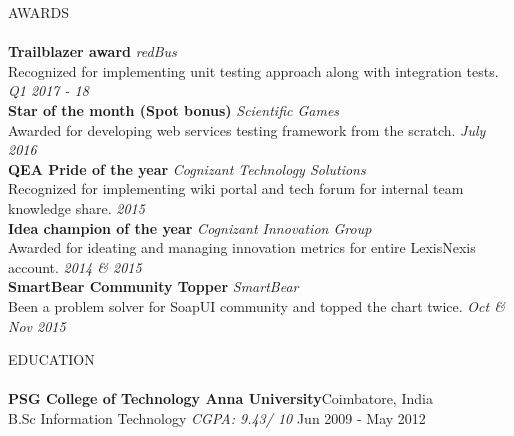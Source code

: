 \documentclass[a4paper]{article}
\newcommand{\lineunder} {
    \vspace*{-8pt} \\
    \hspace*{-18pt} \hrulefill \\
}
\newcommand{\header} [1] {
    {\hspace*{-18pt}\vspace*{6pt} \textsc{#1}}
    \vspace*{-6pt} \lineunder
}
\begin{document}
\header{AWARDS}
\textbf{Trailblazer award} \hfill \textit{redBus}\\
Recognized for implementing unit testing approach along with integration tests. \hfill \textit{Q1 2017 - 18}\\
\vspace*{1mm}
\textbf{Star of the month (Spot bonus)} \hfill \textit{Scientific Games}\\
Awarded for developing web services testing framework from the scratch. \hfill \textit{July 2016}\\
\vspace*{1mm}
\textbf{QEA Pride of the year} \hfill \textit{Cognizant Technology Solutions}\\
Recognized for implementing wiki portal and tech forum for internal team knowledge share. \hfill \textit{2015}\\
\vspace*{1mm}
\textbf{Idea champion of the year} \hfill \textit{Cognizant Innovation Group}\\
Awarded for ideating and managing innovation metrics for entire LexisNexis account. \hfill \textit{2014 \& 2015}\\
\vspace*{1mm}
\textbf{SmartBear Community Topper} \hfill \textit{SmartBear}\\
Been a problem solver for SoapUI community and topped the chart twice. \hfill \textit{Oct \& Nov 2015}\\
\vspace*{1mm}

\header{EDUCATION}
\textbf{PSG College of Technology \textbar{} Anna University}\hfill Coimbatore, India\\
B.Sc Information Technology \textit{CGPA: 9.43/ 10} \hfill Jun 2009 - May 2012\\
\vspace*{-12pt}
\end{document}
